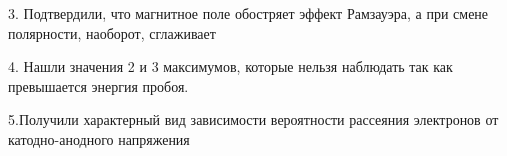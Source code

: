 \documentclass[12pt,a4paper]{article}
\begin{document}
	3. Подтвердили, что магнитное поле обостряет эффект Рамзауэра, а при смене полярности, наоборот, сглаживает
	
	4. Нашли значения 2 и 3 максимумов, которые нельзя наблюдать так как превышается энергия пробоя.
	
	5.Получили характерный вид зависимости вероятности рассеяния электронов от катодно-анодного напряжения
\end{document}
